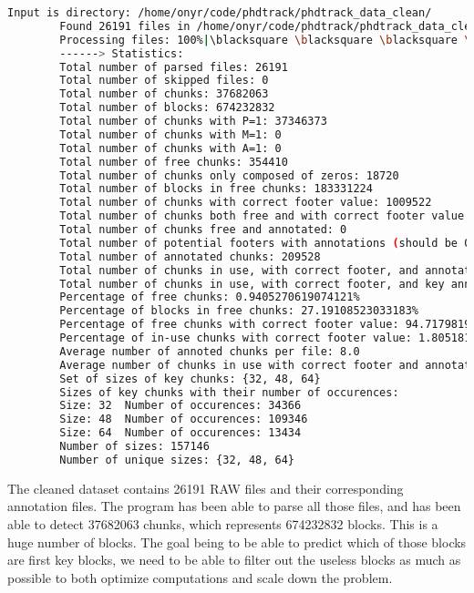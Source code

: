     \begin{lstlisting}[language=bash, caption={Printing cleaned dataset chunk parsing global statistics.}]
        Input is directory: /home/onyr/code/phdtrack/phdtrack_data_clean/
        Found 26191 files in /home/onyr/code/phdtrack/phdtrack_data_clean/.
        Processing files: 100%|\blacksquare \blacksquare \blacksquare \blacksquare \blacksquare | 26191/26191 [12:11<00:00, 35.81it/s, file=7091-1650972335]
        ------> Statistics:
        Total number of parsed files: 26191
        Total number of skipped files: 0
        Total number of chunks: 37682063
        Total number of blocks: 674232832
        Total number of chunks with P=1: 37346373
        Total number of chunks with M=1: 0
        Total number of chunks with A=1: 0
        Total number of free chunks: 354410
        Total number of chunks only composed of zeros: 18720
        Total number of blocks in free chunks: 183331224
        Total number of chunks with correct footer value: 1009522
        Total number of chunks both free and with correct footer value: 335690
        Total number of chunks free and annotated: 0
        Total number of potential footers with annotations (should be 0): 0
        Total number of annotated chunks: 209528
        Total number of chunks in use, with correct footer, and annotated: 7668
        Total number of chunks in use, with correct footer, and key annotated: 7668
        Percentage of free chunks: 0.9405270619074121%
        Percentage of blocks in free chunks: 27.19108523033183%
        Percentage of free chunks with correct footer value: 94.71798199825061%
        Percentage of in-use chunks with correct footer value: 1.8051818044922352%
        Average number of annoted chunks per file: 8.0
        Average number of chunks in use with correct footer and annotated per file: 0.2927723263716544
        Set of sizes of key chunks: {32, 48, 64}
        Sizes of key chunks with their number of occurences:
        Size: 32  Number of occurences: 34366
        Size: 48  Number of occurences: 109346
        Size: 64  Number of occurences: 13434
        Number of sizes: 157146
        Number of unique sizes: {32, 48, 64}
    \end{lstlisting}

    The cleaned dataset contains 26191 RAW files and their corresponding annotation files. The program has been able to parse all those files, and has been able to detect 37682063 chunks, which represents 674232832 blocks. This is a huge number of blocks. The goal being to be able to predict which of those blocks are first key blocks, we need to be able to filter out the useless blocks as much as possible to both optimize computations and scale down the problem. 

